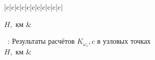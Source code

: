     
    \begin{longtable}[H]{|c|c|c|c|c|c|c|c|c|c|c|}
    \caption{Результаты расчётов $K_{\omega_z}, c$ в узловых точках (таб. \ref{tab:Узловые точки})}
    \hline 
    $H,$ км & \\ \hline
    \endfirsthead
    
    {{ \tablename\ \thetable{}: Результаты расчётов $K_{\omega_z}, c$ в узловых точках}} \\
    \hline 
    $H,$ км & \\ \hline
    \endhead
    \endfoot
    
    \hline \hline
    \endlastfoot


\end{longtable}
